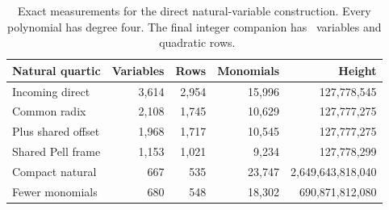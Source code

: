 \begin{table}[htbp]
\centering\small
\begin{tabular}{lrrrr}
\toprule
Natural quartic & Variables & Rows & Monomials & Height\\
\midrule
Incoming direct & 3,614 & 2,954 & 15,996 & 127,778,545\\
Common radix & 2,108 & 1,745 & 10,629 & 127,777,275\\
Plus shared offset & 1,968 & 1,717 & 10,545 & 127,777,275\\
Shared Pell frame & 1,153 & 1,021 & 9,234 & 127,778,299\\
Compact natural & 667 & 535 & 23,747 & 2,649,643,818,040\\
Fewer monomials & 680 & 548 & 18,302 & 690,871,812,080\\
\bottomrule
\end{tabular}
\caption{Exact measurements for the direct natural-variable construction.
Every polynomial has degree four. The final integer companion has
\IntVars\ variables and \IntRows\ quadratic rows.}
\end{table}
